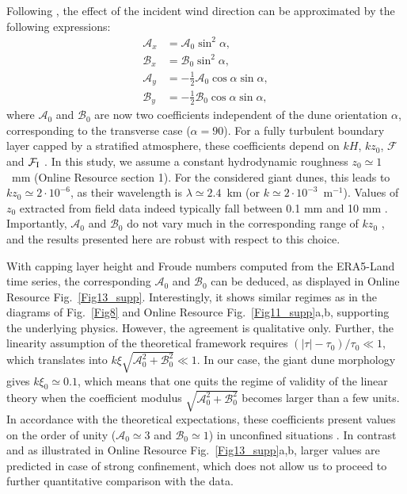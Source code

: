 Following \citet{Andreotti2012}, the effect of the incident wind direction can be approximated by the following expressions:
%
\begin{align}
  \mathcal{A}_{x} & = \mathcal{A}_{0}\sin^{2}\alpha, \\
  \mathcal{B}_{x} & = \mathcal{B}_{0}\sin^{2}\alpha, \\
  \mathcal{A}_{y} & = -\displaystyle\frac{1}{2}\mathcal{A}_{0}\cos\alpha \sin\alpha, \\
  \mathcal{B}_{y} & = -\displaystyle\frac{1}{2}\mathcal{B}_{0}\cos\alpha \sin\alpha,
\end{align}
%
where $\mathcal{A}_{0}$ and $\mathcal{B}_{0}$ are now two coefficients independent of the dune orientation $\alpha$, corresponding to the transverse case ($\alpha=90$). For a fully turbulent boundary layer capped by a stratified atmosphere, these coefficients depend on $k H$, $k z_{0}$, $\mathcal{F}$ and $\mathcal{F}_{\textup{I}}$ \citep{Andreotti2009}. In this study, we assume a constant hydrodynamic roughness $z_{0} \simeq 1$~mm (Online Resource section 1). For the considered giant dunes, this leads to $k z_{0} \simeq 2 \cdot 10^{-6}$, as their wavelength is $\lambda \simeq 2.4$~km (or $k \simeq 2 \cdot 10^{-3}$~m$^{-1}$). Values of $z_{0}$ extracted from field data indeed typically fall between 0.1 mm and 10 mm \citep{Sherman2008, Field2018}. Importantly, $\mathcal{A}_{0}$ and $\mathcal{B}_{0}$ do not vary much in the corresponding range of $k z_{0}$ \citep{Fourriere2010}, and the results presented here are robust with respect to this choice.

With capping layer height and Froude numbers computed from the ERA5-Land time series, the corresponding $\mathcal{A}_{0}$ and $\mathcal{B}_{0}$ can be deduced, as displayed in Online Resource Fig.~\ref{Fig13_supp}. Interestingly, it shows similar regimes as in the diagrams of Fig.~\ref{Fig8} and Online Resource Fig.~\ref{Fig11_supp}a,b, supporting the underlying physics. However, the agreement is qualitative only. Further, the linearity assumption of the theoretical framework requires $\left(\vert \tau \vert - \tau_{0}\right)/\tau_{0} \ll 1$, which translates into $k\xi\sqrt{\mathcal{A}_{0}^{2} + \mathcal{B}_{0}^{2}} \ll 1$. In our case, the giant dune morphology gives $k\xi_0 \simeq 0.1$, which means that one quits the regime of validity of the linear theory when the coefficient modulus $\sqrt{\mathcal{A}_{0}^{2} + \mathcal{B}_{0}^{2}}$ becomes larger than a few units. In accordance with the theoretical expectations, these coefficients present values on the order of unity ($\mathcal{A}_{0} \simeq 3$ and $\mathcal{B}_{0} \simeq 1$) in unconfined situations \citep{Claudin2013, Lu2021}. In contrast and as illustrated in Online Resource Fig.~\ref{Fig13_supp}a,b, larger values are predicted in case of strong confinement, which does not allow us to proceed to further quantitative comparison with the data.


